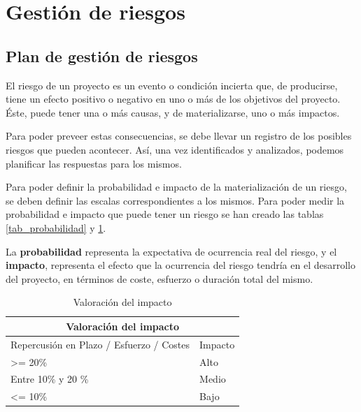 
\section{Gestión de riesgos}

\subsection{Plan de gestión de riesgos}
El riesgo de un proyecto es un evento o condición incierta que, de producirse, tiene un efecto positivo o negativo en uno o más de los objetivos del proyecto. Éste, puede tener una o más causas, y de materializarse, uno o más impactos\cite{pmbok}.


Para poder preveer estas consecuencias, se debe llevar un registro de los posibles riesgos que pueden acontecer. Así, una vez identificados y analizados, podemos planificar las respuestas para los mismos.


Para poder definir la probabilidad e impacto de la materialización de un riesgo, se deben definir las escalas correspondientes a los mismos. Para poder medir la probabilidad e impacto que puede tener un riesgo se han creado las tablas \ref{tab_probabilidad} y \ref{tab_impacto}.


La \textbf{probabilidad} representa la expectativa de ocurrencia real del riesgo, y el \textbf{impacto}, representa el efecto que la ocurrencia del riesgo tendría en el desarrollo del proyecto, en términos de coste, esfuerzo o duración total del mismo. 

\begin{table}[htpb]
\centering
\caption{Valoración del impacto}
\label{tab_impacto}
\begin{tabular}{|l|l|}
\hline
\multicolumn{2}{|c|}{Valoración del impacto}                                                  \\ \hline
\multicolumn{1}{|c|}{Repercusión en Plazo / Esfuerzo / Costes} & \multicolumn{1}{c|}{Impacto} \\ \hline
\textgreater= 20\%                                             & Alto                         \\ \hline
Entre 10\% y 20 \%                                             & Medio                        \\ \hline
\textless= 10\%                                                & Bajo                         \\ \hline
\end{tabular}
\end{table}

